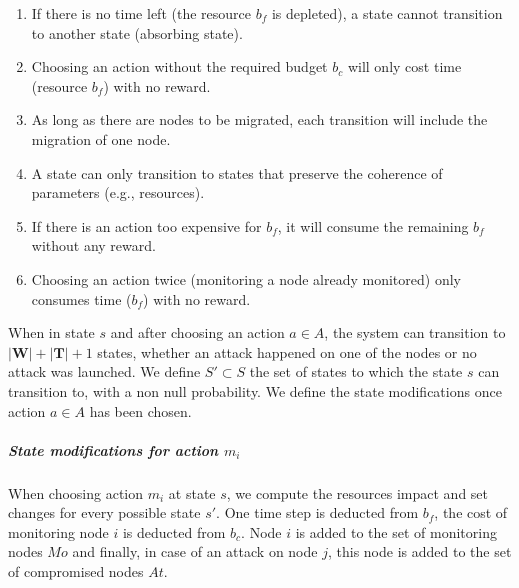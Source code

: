 \begin{enumerate}
    \item If there is no time left (\ie the resource $b_f$ is depleted), a state cannot transition to another state (absorbing state).
    \label{cond:c1}
    \item Choosing an action without the required budget $b_c$ will only cost time (resource $b_f$) with no reward.
    \label{cond:c2}
    \item As long as there are nodes to be migrated, each transition will include the migration of one node.
    \label{cond:c3}
    \item A state can only transition to states that preserve the coherence of parameters (e.g., resources).
    \label{cond:c4}
    \item If there is an action too expensive for $b_f$, it will consume the remaining $b_f$ without any reward.
    \label{cond:c5}
    \item Choosing an action twice (\ie monitoring a node already monitored) only consumes time ($b_f$) with no reward.
    \label{cond:c6}
 \end{enumerate}


When in state $s$ and after choosing an action $a \in A$, the system can transition to $|\textbf{W}|+|\textbf{T}| + 1 $ states, whether an attack happened on one of the nodes or no attack was launched.
We define $S' \subset S$ the set of states to which the state $s$ can transition to, with a non null probability.
We define the state modifications once action $a \in A$ has been chosen.
\\
\subparagraph*{\textbf{State modifications for action $m_i$}}
When choosing action $m_i$ at state $s$, we compute the resources impact and set changes for every possible state $s'$. One time step is deducted from $b_f$, the cost of monitoring node $i$ is deducted from $b_c$. Node $i$ is added to the set of monitoring nodes $Mo$ and finally, in case of an attack on node $j$, this node is added to the set of compromised nodes $At$.

